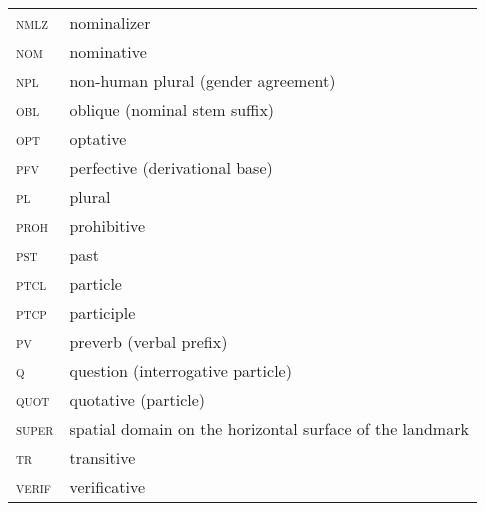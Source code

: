 \documentclass[output=paper]{langsci/langscibook}
\begin{document}
\begin{longtable}[l]{@{}ll@{}}
\textsc{nmlz}	& nominalizer \\
\textsc{nom}	& nominative \\
\textsc{npl}	& non-human plural (gender agreement) \\
\textsc{obl}	& oblique (nominal stem suffix) \\
\textsc{opt}	& optative \\
\textsc{pfv}	& perfective (derivational base) \\
\textsc{pl}	& plural \\
\textsc{proh}	& prohibitive \\
\textsc{pst}	& past \\
\textsc{ptcl}	& particle \\
\textsc{ptcp}	& participle \\
\textsc{pv}	& preverb (verbal prefix) \\
\textsc{q}	& question (interrogative particle) \\
\textsc{quot}	& quotative (particle) \\
\textsc{super}	& spatial domain on the horizontal surface of the landmark \\
\textsc{tr}	& transitive \\
\textsc{verif}	& verificative \\
\end{longtable}


\nocite{kustova2019,daniel2018:aspectual,daniel-maisak-merdanova2012}
\printbibliography[heading=subbibliography,notkeyword=this]
\end{document}

